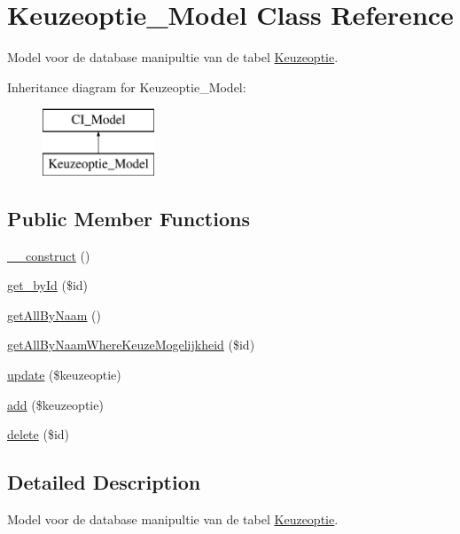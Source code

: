 \hypertarget{class_keuzeoptie___model}{}\section{Keuzeoptie\+\_\+\+Model Class Reference}
\label{class_keuzeoptie___model}


Model voor de database manipultie van de tabel \mbox{\hyperlink{class_keuzeoptie}{Keuzeoptie}}.  


Inheritance diagram for Keuzeoptie\+\_\+\+Model\+:\begin{figure}[H]
\begin{center}
\leavevmode
\includegraphics[height=2.000000cm]{class_keuzeoptie___model}
\end{center}
\end{figure}
\subsection*{Public Member Functions}
\begin{DoxyCompactItemize}
\item 
\mbox{\hyperlink{class_keuzeoptie___model_a114b17b36115323960a9837ce075cbcf}{\+\_\+\+\_\+construct}} ()
\item 
\mbox{\hyperlink{class_keuzeoptie___model_ac16584888f32902c1b65c7b06fd6999a}{get\+\_\+by\+Id}} (\$id)
\item 
\mbox{\hyperlink{class_keuzeoptie___model_a9e17f249c95fd5a6a3d5e6222b048b4c}{get\+All\+By\+Naam}} ()
\item 
\mbox{\hyperlink{class_keuzeoptie___model_af29156c45eb0464a373c6e908982be59}{get\+All\+By\+Naam\+Where\+Keuze\+Mogelijkheid}} (\$id)
\item 
\mbox{\hyperlink{class_keuzeoptie___model_abe363a388f68ec737b0957b748f012d8}{update}} (\$keuzeoptie)
\item 
\mbox{\hyperlink{class_keuzeoptie___model_a05a55a9298a5f2b2a37e3a2ce15046f1}{add}} (\$keuzeoptie)
\item 
\mbox{\hyperlink{class_keuzeoptie___model_a6ed94c4decb1bb7e43021fb8d45574f7}{delete}} (\$id)
\end{DoxyCompactItemize}


\subsection{Detailed Description}
Model voor de database manipultie van de tabel \mbox{\hyperlink{class_keuzeoptie}{Keuzeoptie}}. 

